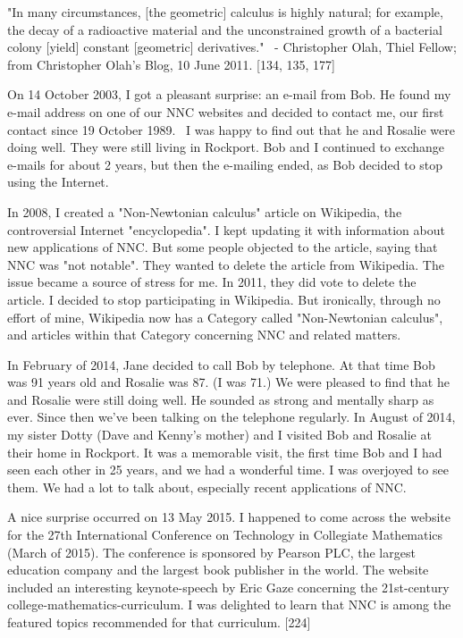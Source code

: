 \documentclass[12pt]{article}
\begin{document}
"In many circumstances, [the geometric] calculus is highly natural; for example, the decay of a radioactive material and the unconstrained growth of a bacterial colony [yield] constant [geometric] derivatives." 
 - Christopher Olah, Thiel Fellow; from Christopher Olah's Blog, 10 June 2011. [134, 135, 177]


On 14 October 2003, I got a pleasant surprise: an e-mail from Bob. He found my e-mail address on one of our NNC websites and decided to contact me, our first contact since 19 October 1989.  I was happy to find out that he and Rosalie were doing well. They were still living in Rockport. Bob and I continued to exchange e-mails for about 2 years, but then the e-mailing ended, as Bob decided to stop using the Internet.

In 2008, I created a "Non-Newtonian calculus" article on Wikipedia, the controversial Internet "encyclopedia". I kept updating it with information about new applications of NNC. But some people objected to the article, saying that NNC was "not notable". They wanted to delete the article from Wikipedia. The issue became a source of stress for me. In 2011, they did vote to delete the article. I decided to stop participating in Wikipedia. But ironically, through no effort of mine, Wikipedia now has a Category called "Non-Newtonian calculus", and articles within that Category concerning NNC and related matters.

In February of 2014, Jane decided to call Bob by telephone. At that time Bob was 91 years old and Rosalie was 87. (I was 71.) We were pleased to find that he and Rosalie were still doing well. He sounded as strong and mentally sharp as ever. Since then we've been talking on the telephone regularly. In August of 2014, my sister Dotty (Dave and Kenny's mother) and I visited Bob and Rosalie at their home in Rockport. It was a memorable visit, the first time Bob and I had seen each other in 25 years, and we had a wonderful time. I was overjoyed to see them. We had a lot to talk about, especially recent applications of NNC. 

A nice surprise occurred on 13 May 2015. I happened to come across the website for the 27th International Conference on Technology in Collegiate Mathematics (March of 2015). The conference is sponsored by Pearson PLC, the largest education company and the largest book publisher in the world. The website included an interesting keynote-speech by Eric Gaze concerning the 21st-century college-mathematics-curriculum. I was delighted to learn that NNC is among the featured topics recommended for that curriculum. [224]                      
\end{document}
